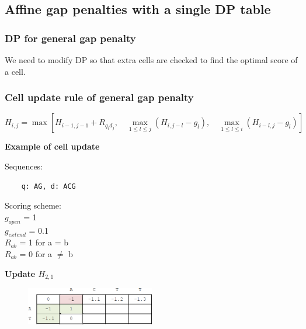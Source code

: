 %
%

%
%
\subsection{Affine gap penalties with a single DP table}

%
%
\subsubsection*{DP for general gap penalty}
We need to modify DP so that extra cells are checked to find the optimal score of a cell. 

%
%
\subsubsection*{Cell update rule of general gap penalty}
\null \medskip  
\begin{equation*}
H_{i,j} =\max \left[H_{i-1,j-1} + R_{q_{i}d_{j}}, \quad \max_{1 \leq l \leq j}(H_{i,j-l} - g_l) ,  \quad \max_{1 \leq l \leq i}(H_{i-l,j} - g_l) \right]
\end{equation*}

%
%
\newpage

\noindent
\textbf{Example of cell update}

\begin{multicols}{2}
Sequences:
\begin{verbatim}
    q: AG, d: ACG
\end{verbatim}
\vfill\null
\columnbreak

\noindent
Scoring scheme: \\
\null \quad $g_{open}$ = 1 \\
\null \quad $g_{extend}$ = 0.1 \\
\null \quad $R_{ab}$ = 1 for a = b \\ 
\null \quad $R_{ab}$ = 0 for a $\neq$ b \\ 

\end{multicols} 

\textbf{Update $H_{2,1}$}

\begin{figure}[H]
  \centering
      \includegraphics[width=0.5\textwidth]{fig03/dp_general_gap_example_1.png}
\end{figure}

